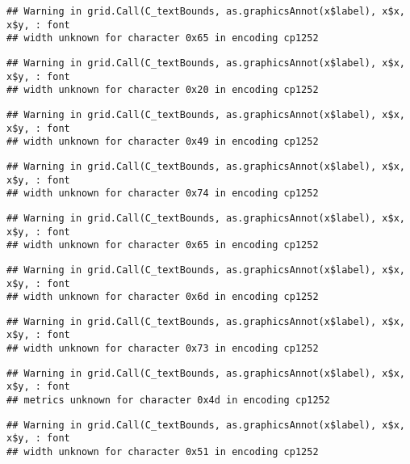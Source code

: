 \documentclass[
]{article}
\begin{document}
\begin{verbatim}
## Warning in grid.Call(C_textBounds, as.graphicsAnnot(x$label), x$x, x$y, : font
## width unknown for character 0x65 in encoding cp1252
\end{verbatim}

\begin{verbatim}
## Warning in grid.Call(C_textBounds, as.graphicsAnnot(x$label), x$x, x$y, : font
## width unknown for character 0x20 in encoding cp1252
\end{verbatim}

\begin{verbatim}
## Warning in grid.Call(C_textBounds, as.graphicsAnnot(x$label), x$x, x$y, : font
## width unknown for character 0x49 in encoding cp1252
\end{verbatim}

\begin{verbatim}
## Warning in grid.Call(C_textBounds, as.graphicsAnnot(x$label), x$x, x$y, : font
## width unknown for character 0x74 in encoding cp1252
\end{verbatim}

\begin{verbatim}
## Warning in grid.Call(C_textBounds, as.graphicsAnnot(x$label), x$x, x$y, : font
## width unknown for character 0x65 in encoding cp1252
\end{verbatim}

\begin{verbatim}
## Warning in grid.Call(C_textBounds, as.graphicsAnnot(x$label), x$x, x$y, : font
## width unknown for character 0x6d in encoding cp1252
\end{verbatim}

\begin{verbatim}
## Warning in grid.Call(C_textBounds, as.graphicsAnnot(x$label), x$x, x$y, : font
## width unknown for character 0x73 in encoding cp1252
\end{verbatim}

\begin{verbatim}
## Warning in grid.Call(C_textBounds, as.graphicsAnnot(x$label), x$x, x$y, : font
## metrics unknown for character 0x4d in encoding cp1252
\end{verbatim}

\begin{verbatim}
## Warning in grid.Call(C_textBounds, as.graphicsAnnot(x$label), x$x, x$y, : font
## width unknown for character 0x51 in encoding cp1252
\end{verbatim}
\end{document}
